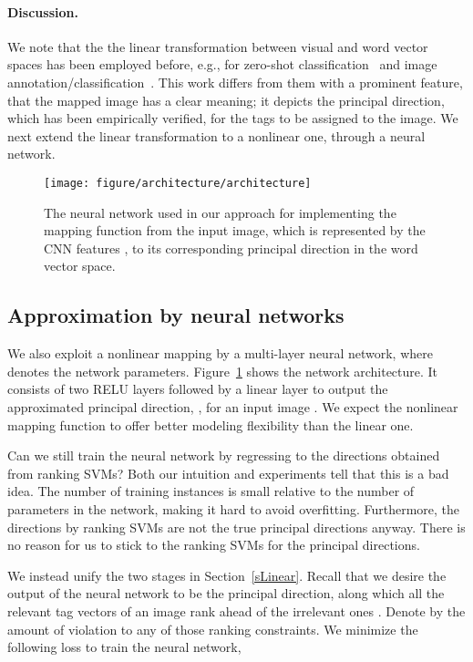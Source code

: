 \documentclass[10pt,twocolumn,letterpaper]{article}
\begin{document}
\paragraph{Discussion.} We note that the the linear transformation between visual and word vector spaces has been employed before, e.g., for zero-shot classification~\cite{akata_label-embedding_2013,frome_devise:_2013} and image annotation/classification~\cite{weston_wsabie:_2011}. This work differs from them with a prominent feature, that the mapped image  has a clear meaning; it depicts the principal direction, which has been empirically verified, for the tags to be assigned to the image. We next extend the linear transformation to a nonlinear one, through a neural network. 





\begin{figure}
\centering
\texttt{[image: figure/architecture/architecture]}
\caption{The neural network used in our approach for implementing the mapping function  from the input image, which is represented by the CNN features , to its corresponding principal direction in the word vector space.}
\label{fNN}
\vspace{-10pt}
\end{figure}



\subsection{Approximation by neural networks}
We also exploit a nonlinear mapping  by a multi-layer neural network, where  denotes the network parameters. Figure~\ref{fNN} shows the network architecture. It consists of two RELU layers followed by a linear layer to output the approximated principal direction, , for an input image . We expect  the nonlinear mapping function  to offer better modeling flexibility than the linear one. 

Can we still train the neural network  by regressing to the  directions obtained from ranking SVMs? Both our intuition and experiments tell that this is a bad idea. The number  of training instances is small relative to the number of parameters in the network, making it hard to avoid overfitting. Furthermore, the directions by ranking SVMs are not the true principal directions anyway. There is no reason for us to stick to the ranking SVMs for the principal directions. 


We instead unify the two stages in Section~\ref{sLinear}. Recall that we desire the output of the neural network  to be the principal direction, along which all the relevant tag vectors  of an image  rank ahead of the irrelevant ones . Denote by  the amount of violation to any of those ranking constraints. We minimize the following  loss to train the neural network,
	 
\end{document}
